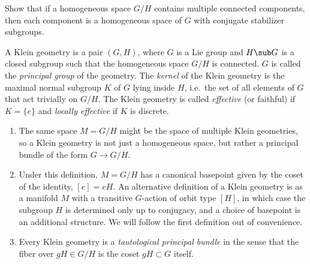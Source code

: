 \begin{xca}
    Show that if a homogeneous space $G\slash H$ contains multiple connected components, then each component is a homogeneous space of $G$ with conjugate stabilizer subgroups.
\end{xca}

\begin{defn}
    A Klein geometry is a pair $(G,H)$, where $G$ is a Lie group and $H\sub G$ is a closed subgroup such that the homogeneous space $G\slash H$ is connected. $G$ is called the \emph{principal group} of the geometry. The \emph{kernel} of the Klein geometry is the maximal normal subgroup $K$ of $G$ lying inside $H$, i.e.\ the set of all elements of $G$ that act trivially on $G\slash H$. The Klein geometry is called \emph{effective} (or faithful) if $K=\{e\}$ and \emph{locally effective} if $K$ is discrete. 
\end{defn}

\begin{rem}
    \begin{enumerate}
        \item The same space $M=G\slash H$ might be the space of multiple Klein geometries, so a Klein geometry is not  just a homogeneous space, but rather a principal bundle of the form $G\to G\slash H$. 
        \item Under this definition, $M=G\slash H$ has a canonical basepoint given by the coset of the identity, $[e]=eH$. An alternative definition of a Klein geometry is as a manifold $M$ with a transitive $G$-action of orbit type $[H]$, in which case the subgroup $H$ is determined only up to conjugacy, and a choice of basepoint is an additional structure. We will follow the first definition out of convenience.
        \item Every Klein geometry is a \emph{tautological principal bundle} in the sense that the fiber over $gH\in G\slash H$ is the coset $gH\subset G$ itself. 
    \end{enumerate}
\end{rem}



